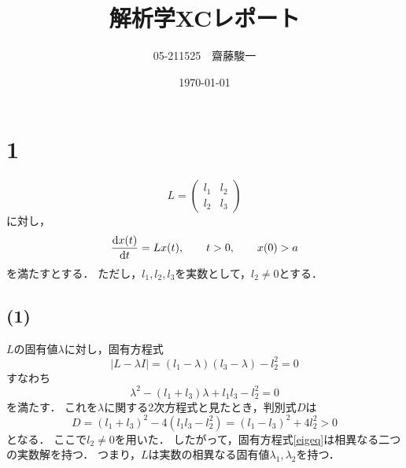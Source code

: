 \documentclass[a4paper,11pt]{jsarticle}
\begin{document}
\title{解析学XCレポート}
\author{05-211525　齋藤駿一}
\date{\today}
\maketitle

\section*{1}
\begin{equation}
  L = \left(
    \begin{matrix}
      l_1 & l_2 \\
      l_2 & l_3 
    \end{matrix}
  \right)
\end{equation}
に対し，
\begin{equation}
  \dv{x(t)}{t} = Lx(t),\qquad t>0,\qquad x(0)>a
\end{equation}
を満たすとする．
ただし，$l_1,l_2,l_3$を実数として，$l_2\neq 0$とする．

\subsection*{(1)}
$L$の固有値$\lambda$に対し，固有方程式
\begin{equation}
  \left|L-\lambda I\right| = (l_1-\lambda)(l_3-\lambda)-l_2^2 = 0
\end{equation}
すなわち
\begin{equation}
  \lambda^2 - (l_1+l_3)\lambda + l_1l_3-l_2^2 = 0 \label{eigeq}
\end{equation}
を満たす．
これを$\lambda$に関する2次方程式と見たとき，判別式$D$は
\begin{equation}
  D = (l_1+l_3)^2 - 4(l_1l_3-l_2^2) = (l_1-l_3)^2 + 4l_2^2 > 0
\end{equation}
となる．
ここで$l_2\neq 0$を用いた．
したがって，固有方程式\eqref{eigeq}は相異なる二つの実数解を持つ．
つまり，$L$は実数の相異なる固有値$\lambda_1,\lambda_2$を持つ．
\end{document}
